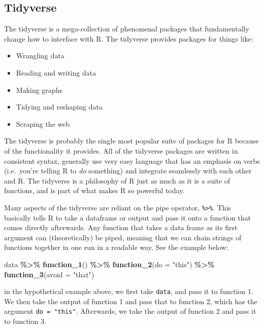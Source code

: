 \documentclass[
]{book}
\newenvironment{Shaded}{\begin{snugshade}}{\end{snugshade}}
\newcommand{\AttributeTok}[1]{\textcolor[rgb]{0.13,0.29,0.53}{#1}}
\newcommand{\FunctionTok}[1]{\textcolor[rgb]{0.13,0.29,0.53}{\textbf{#1}}}
\newcommand{\NormalTok}[1]{#1}
\newcommand{\SpecialCharTok}[1]{\textcolor[rgb]{0.81,0.36,0.00}{\textbf{#1}}}
\newcommand{\StringTok}[1]{\textcolor[rgb]{0.31,0.60,0.02}{#1}}
\providecommand{\tightlist}{%
  \setlength{\itemsep}{0pt}\setlength{\parskip}{0pt}}
\begin{document}
\hypertarget{tidyverse}{%
\subsection{Tidyverse}\label{tidyverse}}

The tidyverse is a mega-collection of phenomenal packages that fundamentally change how to interface with R. The tidyverse provides packages for things like:

\begin{itemize}
\tightlist
\item
  Wrangling data
\item
  Reading and writing data
\item
  Making graphs
\item
  Tidying and reshaping data
\item
  Scraping the web
\end{itemize}

The tidyverse is probably the single most popular suite of packages for R because of the functionality it provides. All of the tidyverse packages are written in consistent syntax, generally use very easy language that has an emphasis on verbs (i.e.~you're telling R to \emph{do} something) and integrate seamlessly with each other and R. The tidyverse is a philosophy of R just as much as it is a suite of functions, and is part of what makes R so powerful today.

Many aspects of the tidyverse are reliant on the pipe operator, \texttt{\%\textgreater{}\%}. This basically tells R to take a dataframe or output and pass it onto a function that comes directly afterwards. Any function that takes a data frame as its first argument can (theoretically) be piped, meaning that we can chain strings of functions together in one run in a readable way. See the example below:

\begin{Shaded}
\begin{Highlighting}[]
\NormalTok{data }\SpecialCharTok{\%\textgreater{}\%}
  \FunctionTok{function\_1}\NormalTok{() }\SpecialCharTok{\%\textgreater{}\%}
  \FunctionTok{function\_2}\NormalTok{(}\AttributeTok{do =} \StringTok{"this"}\NormalTok{) }\SpecialCharTok{\%\textgreater{}\%}
  \FunctionTok{function\_3}\NormalTok{(}\AttributeTok{avoid =} \StringTok{"that"}\NormalTok{)}
\end{Highlighting}
\end{Shaded}

in the hypothetical example above, we first take \texttt{data}, and pass it to function 1. We then take the output of function 1 and pass that to function 2, which has the argument \texttt{do\ =\ "this"}. Afterwards, we take the output of function 2 and pass it to function 3.
\end{document}
